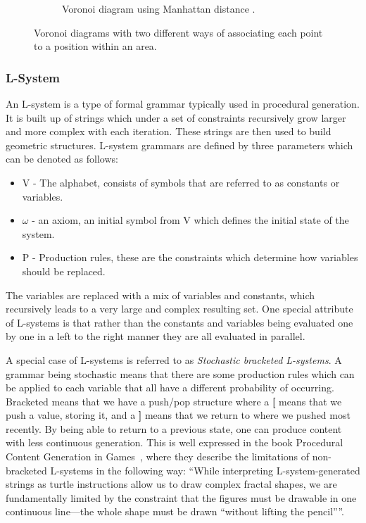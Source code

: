 \begin{figure}[H]
\begin{subfigure}[b]{0.49\textwidth}
    \caption{Voronoi diagram using Manhattan distance \cite{voronoi_diagram_manhattan}.}
    \label{fig:voronoi_manhattan}
  \end{subfigure}
  \caption{Voronoi diagrams with two different ways of associating each point to a position within an area.}
  \label{fig:voronoi}
\end{figure}

\subsubsection{L-System}
An L-system is a type of formal grammar typically used in procedural generation.
It is built up of strings which under a set of constraints recursively grow larger and more complex with each iteration.
These strings are then used to build geometric structures.
L-system grammars are defined by three parameters which can be denoted as follows:

\begin{itemize}
  \item V  - The alphabet, consists of symbols that are referred to as constants or variables.
  \item $\omega$ - an axiom, an initial symbol from V which defines the initial state of the system.
  \item P - Production rules, these are the constraints which determine how variables should be replaced.
\end{itemize}

The variables are replaced with a mix of variables and constants, which recursively leads to a very large and complex resulting set.
One special attribute of L-systems is that rather than the constants and variables being evaluated one by one in a left to the right manner they are all evaluated in parallel.

A special case of L-systems is referred to as \textit{Stochastic bracketed L-systems}.
A grammar being stochastic means that there are some production rules which can be applied to each variable that all have a different probability of occurring.
Bracketed means that we have a push/pop structure where a \textbf{[} means that we push a value, storing it, and a \textbf{]} means that we return to where we pushed most recently.
By being able to return to a previous state, one can produce content with less continuous generation.
This is well expressed in the book Procedural Content Generation in Games~\cite[p.77]{PCG_in_games}, where they describe the limitations of non-bracketed L-systems in the following way:
“While interpreting L-system-generated strings as turtle instructions allow us to draw complex fractal shapes, we are fundamentally limited by the constraint that the figures must be drawable in one continuous line—the whole shape must be drawn “without lifting the pencil””. 

